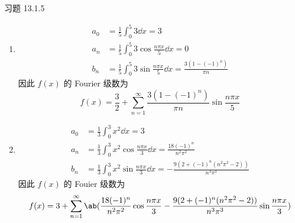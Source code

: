 \begin{problem}
    习题 13.1.5
    \begin{solution}
        \begin{enumerate}
            \item[\textbf{1)}]
            $$
            \begin{aligned}
                a_0 & = \frac{1}{5} \int_{0}^{5} 3 \dd{x} = 3 \\
                a_n & = \frac{1}{5} \int_{0}^{5} 3 \cos \frac{n \pi x}{5} \dd{x} = 0 \\
                b_n & = \frac{1}{5} \int_{0}^{5} 3 \sin \frac{n \pi x}{5} \dd{x} = \frac{3 (1 - (-1)^{n})}{\pi n}
            \end{aligned}
            $$
            因此 $f(x)$ 的 Fourier 级数为
            $$
            f(x) = \frac{3}{2} + \sum_{n = 1}^{\infty} \frac{3 (1 - (-1)^{n})}{\pi n} \sin \frac{n \pi x}{5}
            $$

            \item[\textbf{3)}]
            $$
            \begin{aligned}
                a_0 & = \frac{1}{3} \int_{0}^{3} x^2 \dd{x} = 3 \\
                a_n & = \frac{1}{3} \int_{0}^{3} x^2 \cos \frac{n \pi x}{3} \dd{x} = \frac{18 (-1)^{n}}{n^2 \pi^2} \\
                b_n & = \frac{1}{3} \int_{0}^{3} x^2 \sin \frac{n \pi x}{3} \dd{x} = - \frac{9 (2 + (-1)^{n} (n^2 \pi^2 - 2))}{n^3 \pi^3}
            \end{aligned}
            $$
            因此 $f(x)$ 的 Fouier 级数为
            $$
            f(x) = 3 + \sum_{n = 1}^{\infty} \ab(\frac{18 (-1)^{n}}{n^2 \pi^2} \cos \frac{n \pi x}{3} - \frac{9 (2 + (-1)^{n} (n^2 \pi^2 - 2))}{n^3 \pi^3} \sin \frac{n \pi x}{3})
            $$
        \end{enumerate}
    \end{solution}
\end{problem}

